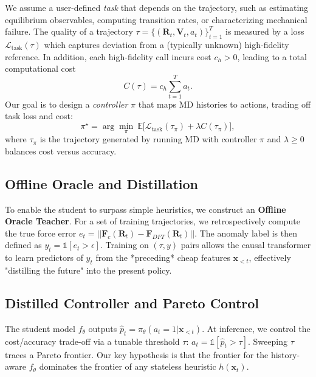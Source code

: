 \documentclass{article}
\begin{document}
We assume a user-defined \emph{task} that depends on the trajectory, such as estimating equilibrium observables, computing transition rates, or characterizing mechanical failure. The quality of a trajectory $\tau = \{(\mathbf{R}_t, \mathbf{V}_t, a_t)\}_{t=1}^T$ is measured by a loss $\mathcal{L}_\text{task}(\tau)$ which captures deviation from a (typically unknown) high-fidelity reference. In addition, each high-fidelity call incurs cost $c_h > 0$, leading to a total computational cost
\begin{equation}
    C(\tau) = c_h \sum_{t=1}^T a_t.
\end{equation}
Our goal is to design a \emph{controller} $\pi$ that maps MD histories to actions, trading off task loss and cost:
\begin{equation}
    \pi^\star = \arg\min_{\pi} \ \mathbb{E}\big[ \mathcal{L}_\text{task}(\tau_\pi) + \lambda C(\tau_\pi) \big],
    \label{eq:objective}
\end{equation}
where $\tau_\pi$ is the trajectory generated by running MD with controller $\pi$ and $\lambda \geq 0$ balances cost versus accuracy.

\subsection{Offline Oracle and Distillation}
To enable the student to surpass simple heuristics, we construct an \textbf{Offline Oracle Teacher}. For a set of training trajectories, we retrospectively compute the true force error $e_t = ||\mathbf{F}_c(\mathbf{R}_t) - \mathbf{F}_{DFT}(\mathbf{R}_t)||$.
The anomaly label is then defined as $y_t = \mathbb{1}[e_t > \epsilon]$.
Training on $( \tau, y )$ pairs allows the causal transformer to learn predictors of $y_t$ from the *preceding* cheap features $\mathbf{x}_{<t}$, effectively "distilling the future" into the present policy.

\subsection{Distilled Controller and Pareto Control}
The student model $f_\theta$ outputs $\hat{p}_t = \pi_\theta(a_t=1 | \mathbf{x}_{<t})$. At inference, we control the cost/accuracy trade-off via a tunable threshold $\tau$: $a_t = \mathbb{1}[\hat{p}_t > \tau]$.
Sweeping $\tau$ traces a Pareto frontier. Our key hypothesis is that the frontier for the history-aware $f_\theta$ dominates the frontier of any stateless heuristic $h(\mathbf{x}_t)$.
\end{document}
